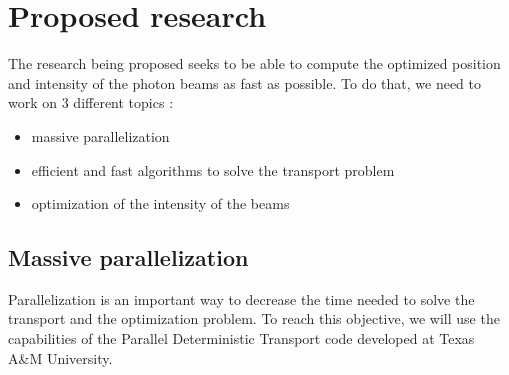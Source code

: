 \section{Proposed research}
The research being proposed seeks to be able to compute the optimized position
and intensity of the photon beams as fast as possible. To do that, we need to
work on 3 different topics :
\begin{itemize}
\item massive parallelization
\item efficient and fast algorithms to solve the transport problem
\item optimization of the intensity of the beams 
\end{itemize}

\subsection{Massive parallelization}
Parallelization is an important way to decrease the time needed to solve the
transport and the optimization problem. To reach this objective, we will use
the capabilities of the Parallel Deterministic Transport code developed at
Texas A\&M University. 


